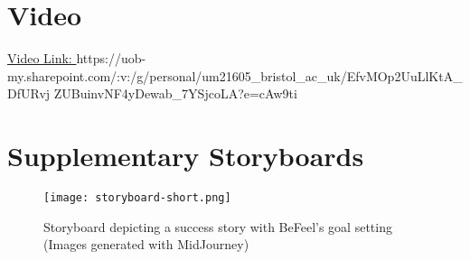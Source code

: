 \documentclass[acmsmall, screen, nonacm, 9pt, a4paper,top=2cm,bottom=2cm,left=1cm,right=1cm, marginparwidth=1cm]{acmart}
\begin{document}
\section{Video}
\href{https://uob-my.sharepoint.com/:v:/g/personal/um21605_bristol_ac_uk/EfvMOp2UuLlKtA_DfURvjZUBuinvNF4yDewab_7YSjcoLA?e=cAw9ti}{Video Link: }
https://uob-my.sharepoint.com/:v:/g/personal/um21605\_bristol\_ac\_uk/EfvMOp2UuLlKtA\_DfURvj
ZUBuinvNF4yDewab\_7YSjcoLA?e=cAw9ti




\appendix
\section{Supplementary Storyboards}
\begin{figure}[H]
    \centering
    \texttt{[image: storyboard-short.png]}
    \caption{Storyboard depicting a success story with BeFeel's goal setting (Images generated with MidJourney)}
    \label{fig:storyboard-short}
\end{figure}
\end{document}
